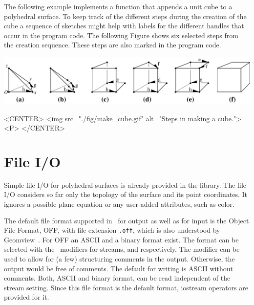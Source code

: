The following example implements a function that appends a unit cube
to a polyhedral surface. To keep track of the different steps during
the creation of the cube a sequence of sketches might help with labels
for the different handles that occur in the program code. The following
Figure shows six selected steps from the creation sequence. These steps 
are also marked in the program code.

\begin{ccTexOnly}
    \begin{center}
      \parbox{\textwidth}{%
          \includegraphics[width=\textwidth]{Polyhedron/fig/make_cube}%
      }
    \end{center}
\end{ccTexOnly}

\begin{ccHtmlOnly}
    <CENTER>
        <img src="./fig/make_cube.gif" alt="Steps in making a cube."><P>
    </CENTER>
\end{ccHtmlOnly}





\section{File I/O}
\label{sectionPolyIO}

Simple file I/O for polyhedral surfaces is already provided in the
library. The file I/O considers so far only the topology of the
surface and its point coordinates. It ignores a possible plane
equation or any user-added attributes, such as color.

The default file format supported in \cgal\ for output as well as for
input is the Object File Format, OFF, with file extension {\tt .off},
which is also understood by Geomview~\cite{cgal:p-gmgv16-96}. For OFF
an ASCII and a binary format exist. The format can be selected with
the \cgal\ modifiers for streams,  and
 respectively. The modifier 
can be used to allow for (a few) structuring comments in the
output. Otherwise, the output would be free of comments.  The default
for writing is ASCII without comments. Both, ASCII and binary format,
can be read independent of the stream setting. Since this file format
is the default format, iostream operators are provided for it.

